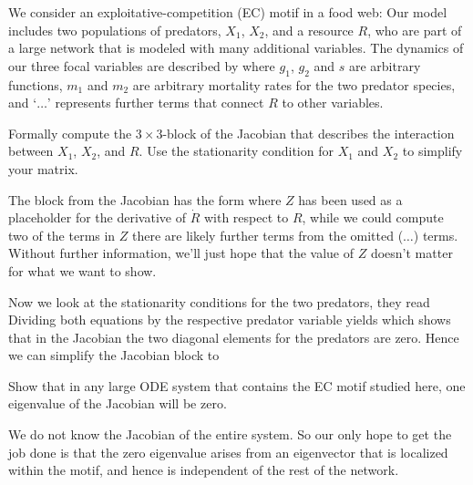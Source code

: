We consider an exploitative-competition (EC) motif in a food web: Our model includes two populations of predators, $X_1$, $X_2$, and a resource $R$, who are part of a large network that is modeled with many additional variables. The dynamics of our three focal variables are described by
where $g_1$, $g_2$ and $s$ are arbitrary functions, $m_1$ and $m_2$ are arbitrary mortality rates for the two predator species, and `$\ldots$' represents further terms that connect $R$ to other variables. 

\subquestion Formally compute the $3\times 3$-block of the Jacobian that describes the interaction between $X_1$, $X_2$, and $R$. Use the stationarity condition for $X_1$ and $X_2$ to simplify your matrix. 

\solution
The block from the Jacobian has the form
where $Z$ has been used as a placeholder for the derivative of $\dot{R}$ with respect to $R$, while we could compute two of the terms in $Z$ there are likely further terms from the omitted ($\ldots$) terms. Without further information, we'll just hope that the value of $Z$ doesn't matter for what we want to show.  

Now we look at the stationarity conditions for the two predators, they read
Dividing both equations by the respective predator variable yields
which shows that in the Jacobian the two diagonal elements for the predators are zero.  Hence we can simplify the Jacobian block to  

\subquestion Show that in any large ODE system that contains the EC motif studied here, one eigenvalue of the Jacobian will be zero.

\solution
We do not know the Jacobian of the entire system. So our only hope to get the job done is that the zero eigenvalue arises from an eigenvector that is localized within the motif, and hence is independent of the rest of the network. 

